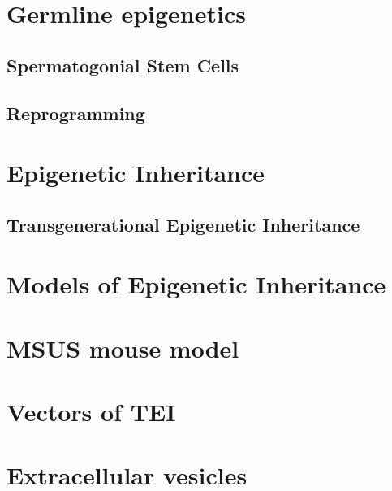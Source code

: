 \documentclass[12pt,twoside]{reedthesis}
\begin{document}
\hypertarget{germline-epigenetics}{%
\section{Germline epigenetics}\label{germline-epigenetics}}

\hypertarget{spermatogonial-stem-cells}{%
\subsection{Spermatogonial Stem Cells}\label{spermatogonial-stem-cells}}

\hypertarget{reprogramming}{%
\subsection{Reprogramming}\label{reprogramming}}

\hypertarget{epigenetic-inheritance}{%
\section{Epigenetic Inheritance}\label{epigenetic-inheritance}}

\hypertarget{transgenerational-epigenetic-inheritance}{%
\subsection{Transgenerational Epigenetic Inheritance}\label{transgenerational-epigenetic-inheritance}}

\hypertarget{models-of-epigenetic-inheritance}{%
\section{Models of Epigenetic Inheritance}\label{models-of-epigenetic-inheritance}}

\hypertarget{msus-mouse-model}{%
\section{MSUS mouse model}\label{msus-mouse-model}}

\hypertarget{vectors-of-tei}{%
\section{Vectors of TEI}\label{vectors-of-tei}}

\hypertarget{extracellular-vesicles}{%
\section{Extracellular vesicles}\label{extracellular-vesicles}}
\end{document}
